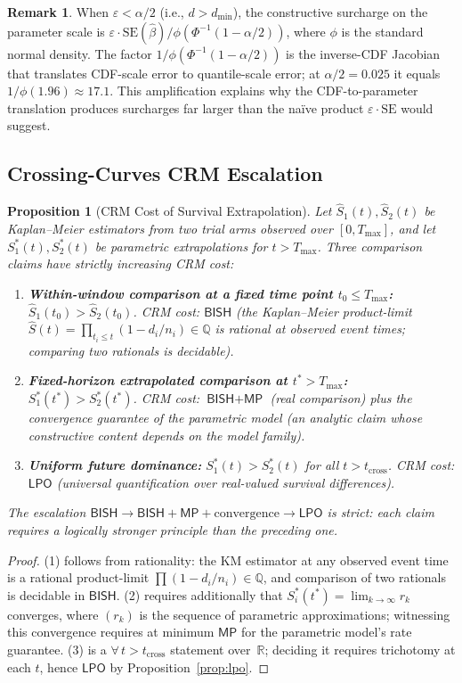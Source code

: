 \documentclass[11pt,a4paper]{article}
\theoremstyle{plain}
\newtheorem{proposition}[theorem]{Proposition}
\theoremstyle{definition}
\newtheorem{remark}[theorem]{Remark}
\newcommand{\BISH}{\textsf{BISH}}
\newcommand{\LPO}{\textsf{LPO}}
\newcommand{\MP}{\textsf{MP}}
\newcommand{\Q}{\mathbb{Q}}
\newcommand{\R}{\mathbb{R}}
\renewcommand{\Phi}{\varPhi}
\begin{document}
\begin{remark}
When $\varepsilon < \alpha/2$ (i.e., $d > d_{\min}$), the constructive surcharge on the parameter scale is $\varepsilon \cdot \mathrm{SE}(\hat\beta) / \phi(\Phi^{-1}(1-\alpha/2))$, where $\phi$ is the standard normal density.  The factor $1/\phi(\Phi^{-1}(1-\alpha/2))$ is the inverse-CDF Jacobian that translates CDF-scale error to quantile-scale error; at $\alpha/2 = 0.025$ it equals $1/\phi(1.96) \approx 17.1$.  This amplification explains why the CDF-to-parameter translation produces surcharges far larger than the na\"ive product $\varepsilon \cdot \mathrm{SE}$ would suggest.
\end{remark}

\subsection{Crossing-Curves CRM Escalation}

\begin{proposition}[CRM Cost of Survival Extrapolation]\label{prop:extrap}
Let $\hat S_1(t), \hat S_2(t)$ be Kaplan--Meier estimators from two trial arms observed over $[0, T_{\max}]$, and let $S_1^*(t), S_2^*(t)$ be parametric extrapolations for $t > T_{\max}$.  Three comparison claims have strictly increasing CRM cost:
\begin{enumerate}[nosep]
\item \textbf{Within-window comparison at a fixed time point $t_0 \leq T_{\max}$:} $\hat S_1(t_0) > \hat S_2(t_0)$.  CRM cost: $\BISH$ (the Kaplan--Meier product-limit $\hat S(t) = \prod_{t_i \leq t}(1 - d_i/n_i) \in \Q$ is rational at observed event times; comparing two rationals is decidable).
\item \textbf{Fixed-horizon extrapolated comparison at $t^* > T_{\max}$:} $S_1^*(t^*) > S_2^*(t^*)$.  CRM cost: $\BISH + \MP$ (real comparison) plus the convergence guarantee of the parametric model (an analytic claim whose constructive content depends on the model family).
\item \textbf{Uniform future dominance:} $S_1^*(t) > S_2^*(t)$ for all $t > t_{\mathrm{cross}}$.  CRM cost: $\LPO$ (universal quantification over real-valued survival differences).
\end{enumerate}
The escalation $\BISH \to \BISH{+}\MP{+}\text{convergence} \to \LPO$ is strict: each claim requires a logically stronger principle than the preceding one.
\end{proposition}

\begin{proof}
(1) follows from rationality: the KM estimator at any observed event time is a rational product-limit $\prod(1 - d_i/n_i) \in \Q$, and comparison of two rationals is decidable in $\BISH$.  (2) requires additionally that $S_i^*(t^*) = \lim_{k \to \infty} r_k$ converges, where $(r_k)$ is the sequence of parametric approximations; witnessing this convergence requires at minimum $\MP$ for the parametric model's rate guarantee.  (3) is a $\forall\, t > t_{\mathrm{cross}}$ statement over~$\R$; deciding it requires trichotomy at each $t$, hence $\LPO$ by Proposition~\ref{prop:lpo}.
\end{proof}
\end{document}
